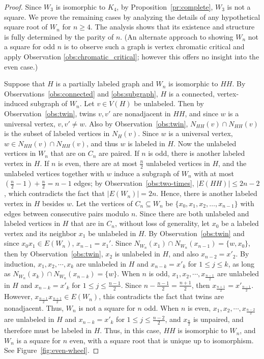 \documentclass{article}
\theoremstyle{definition}
\begin{document}
\begin{proof}
Since $W_3$ is isomorphic to $K_4$, by Proposition~\ref{pr:complete}, $W_3$ is not a square. We prove the remaining cases by analyzing the details of any hypothetical square root of $W_n$ for $n \geq 4$.  The analysis shows that its existence and structure is fully determined by the parity of $n$.  (An alternate approach to showing $W_n$ not a square for odd $n$ is to observe such a graph is vertex chromatic critical and apply Observation \ref{obs:chromatic_critical}; however this offers no insight into the even case.)

Suppose that $H$ is a partially labeled graph and $W_n$ is isomorphic to $HH$. By Observations~\ref{obs:connected} and \ref{obs:subgraph}, $H$ is a connected, vertex-induced subgraph of $W_n$. Let $v\in V(H)$ be unlabeled. Then by Observation~\ref{obs:twin}, twins $v,v'$ are nonadjacent in $HH$, and since $w$ is a 
universal vertex, $v, v'\neq w$. Also by Observation~\ref{obs:twin}, $N_{HH}(v)\cap N_{HH}(v)$ is the subset of labeled vertices in $N_H(v)$. Since $w$ is a universal vertex, $w\in N_{HH}(v)\cap N_{HH}(v)$, and thus $w$ is labeled in $H$. Now the unlabeled vertices in $W_n$ that are on $C_n$ are paired. If $n$ is odd, there is another labeled vertex in $H$. If $n$ is even, there are at most $\frac{n}{2}$ unlabeled vertices in $H$, and the unlabeled vertices together 
with $w$ induce a subgraph of $W_n$ with at most $(\frac{n}{2}-1)+\frac{n}{2}=n-1$ edges; by Observation~\ref{obs:two-times}, $|E(HH)|\leq 2n-2$, which contradicts the fact that $|E(W_n)|=2n$. Hence, there is another labeled vertex in $H$ besides $w$. Let the vertices of $C_n\subseteq W_n$ be $\{x_0,x_1, x_2, \ldots, x_{n-1}\}$ with edges between consecutive pairs modulo $n$. Since there are both unlabeled and labeled vertices in $H$ that are in $C_n$, without loss of generality, let $x_0$ be a labeled vertex and its neighbor $x_1$ be unlabeled in $H$. By 
Observation~\ref{obs:twin} and since $x_0x_1\in E(W_n)$, $x_{n-1}=x_1'$. Since $N_{W_n}(x_1)\cap N_{W_n}(x_{n-1})=\{w, x_0\}$, then by Observation~\ref{obs:twin}, $x_2$ is unlabeled in $H$, and also $x_{n-2}=x'_2$. By induction, $x_1, x_2, \cdots, x_k$ are unlabeled in $H$ and $x_{n-k}=x'_k$ for $1\leq j\leq k$, as long as $N_{W_n}(x_k)\cap N_{W_n}
(x_{n-k})=\{w\}$. When $n$ is odd,  $x_1, x_2, \cdots, x_{\frac{n-1}{2}}$ are unlabeled in $H$ and $x_{n-k}=x'_k$ for $1\leq j\leq \frac{n-1}{2}$. Since $n-\frac{n-1}{2}=\frac{n+1}{2}$, then $x_{\frac{n+1}{2}}=x'_{\frac{n-1}{2}}$. However, $x_{\frac{n-1}{2}}x_{\frac{n+1}{2}}\in E(W_n)$, this contradicts the fact that twins are nonadjacent. Thus, $W_n$ is not a square for $n$ odd. When $n$ is even,  $x_1, x_2, \cdots, x_{\frac{n-2}{2}}$ are unlabeled in $H$ and 
$x_{n-k}=x'_k$ for $1\leq j\leq \frac{n-2}{2}$, and $x_{\frac{n}{2}}$ is unpaired, and therefore must be labeled in $H$. Thus, in this case, $HH$ is isomorphic to $W_n$, and $W_n$ is a square for $n$ even, with a square root that is unique up to isomorphism. See Figure~\ref{fig:even-wheel}.
\end{proof}
\end{document}

